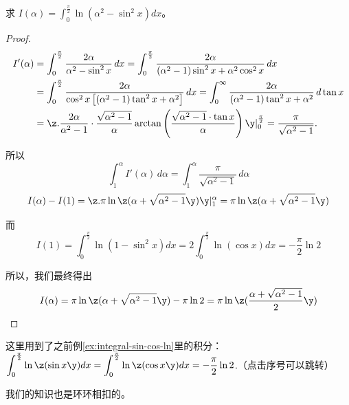 \begin{example}
    求 $\displaystyle I(\alpha) = \int_{0}^{\frac{\pi}{2}} \ln\left( \alpha^2 - \sin^2 x \right) dx$。
\end{example}

\begin{proof}
    \begin{align*}
        I'(\alpha) &= \int_{0}^{\frac{\pi}{2}} \frac{2\alpha}{\alpha^2 - \sin^2 x} \, dx 
        = \int_{0}^{\frac{\pi}{2}} \frac{2\alpha}{(\alpha^2 - 1)\sin^2 x + \alpha^2 \cos^2 x} \, dx \\
        &= \int_{0}^{\frac{\pi}{2}} \frac{2\alpha}{\cos^2 x \left[ (\alpha^2 - 1) \tan^2 x + \alpha^2 \right]} \, dx 
        = \int_{0}^{\infty} \frac{2\alpha}{(\alpha^2 - 1) \tan^2 x + \alpha^2} \, d \tan x  \\
        &=\z. \frac{2\alpha}{\alpha^2 - 1} \cdot \frac{\sqrt{\alpha^2 - 1}}{\alpha} \arctan\left( \frac{\sqrt{\alpha^2 - 1}\cdot \tan x }{\alpha} \right) \y|_{0}^{\frac{\pi}{2}} 
        = \frac{\pi}{\sqrt{\alpha^2 - 1}}.
    \end{align*}

    所以
    \[ \int_{1}^{\alpha} I'(\alpha) \,d\alpha = \int_{1}^{\alpha} \frac{\pi}{\sqrt{\alpha^2 - 1}}\, d\alpha \]
    \[
        I(\alpha) - I(1 )= \z. \pi \ln\z( \alpha + \sqrt{\alpha^2 - 1} \y) \y|^{\alpha}_{1} = \pi \ln\z( \alpha + \sqrt{\alpha^2 - 1} \y)
    \]

    而$$ I(1)= \int_{0}^{\frac{\pi}{2}} \ln\left( 1 -\sin^2 x \right) dx 
    = 2\int_{0}^{\frac{\pi}{2}} \ln\left( \cos x \right) dx = -\frac{\pi}{2} \ln 2$$
    
    所以，我们最终得出
    $$ I(\alpha) = \pi \ln\z( \alpha + \sqrt{\alpha^2 - 1} \y) - \pi\ln2 
                 = \pi \ln\z( \frac{\alpha + \sqrt{\alpha^2 - 1}}{2}  \y) $$
\end{proof}
\begin{note}
这里用到了之前例\ref{ex:integral-sin-cos-ln}里的积分：$ \displaystyle \int_{0}^{\frac{\pi}{2}} \ln \z( \sin x \y) dx = \int_{0}^{\frac{\pi}{2}} \ln \z( \cos x \y) dx =-\frac{\pi}{2} \ln 2 $.（点击序号可以跳转）

我们的知识也是环环相扣的。
\end{note}


\newpage




